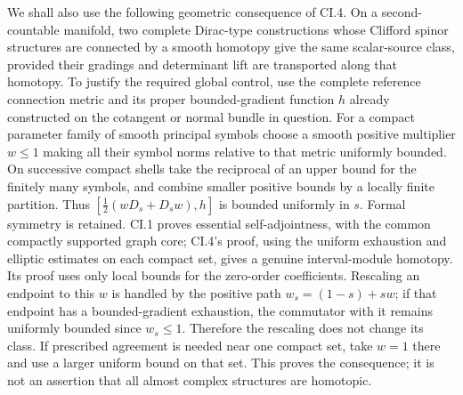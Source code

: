 \documentclass[
  11pt,
]{article}
\begin{document}
We shall also use the following geometric consequence of CI.4. On a
second-countable manifold, two complete Dirac-type constructions whose
Clifford spinor structures are connected by a smooth homotopy give the
same scalar-source class, provided their gradings and determinant lift
are transported along that homotopy. To justify the required global
control, use the complete reference connection metric and its proper
bounded-gradient function \(h\) already constructed on the cotangent or
normal bundle in question. For a compact parameter family of smooth
principal symbols choose a smooth positive multiplier \(w\leq1\) making
all their symbol norms relative to that metric uniformly bounded. On
successive compact shells take the reciprocal of an upper bound for the
finitely many symbols, and combine smaller positive bounds by a locally
finite partition. Thus \([\frac12(wD_s+D_sw),h]\) is bounded uniformly
in \(s\). Formal symmetry is retained. CI.1 proves essential
self-adjointness, with the common compactly supported graph core; CI.4's
proof, using the uniform exhaustion and elliptic estimates on each
compact set, gives a genuine interval-module homotopy. Its proof uses
only local bounds for the zero-order coefficients. Rescaling an endpoint
to this \(w\) is handled by the positive path \(w_s=(1-s)+sw\); if that
endpoint has a bounded-gradient exhaustion, the commutator with it
remains uniformly bounded since \(w_s\leq1\). Therefore the rescaling
does not change its class. If prescribed agreement is needed near one
compact set, take \(w=1\) there and use a larger uniform bound on that
set. This proves the consequence; it is not an assertion that all almost
complex structures are homotopic.
\end{document}
